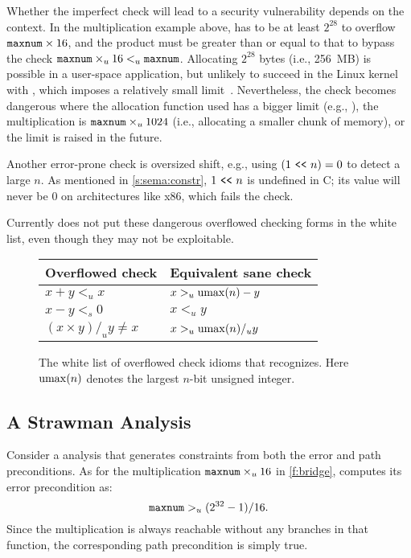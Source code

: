 Whether the imperfect check will lead to a security vulnerability
depends on the context.  In the multiplication example above,
 has to be at least $2^{28}$ to overflow $\texttt{maxnum}
\times 16$, and the product must be greater than or equal to that
to bypass the check $\texttt{maxnum} \times_u 16 <_u \texttt{maxnum}$.
Allocating $2^{28}$ bytes (i.e., 256~MB) is possible in a user-space
application, but unlikely to succeed in the Linux kernel with
, which imposes a relatively small
limit~\cite[\chapterautorefname~8]{ldd3}.  Nevertheless, the check
becomes dangerous where the allocation function used has a bigger
limit (e.g., ), the multiplication is $\texttt{maxnum}
\times_u 1024$ (i.e., allocating a smaller chunk of memory), or the
 limit is raised in the future.

Another error-prone check is oversized shift, e.g., using $(1 \ \texttt{<}\texttt{<}\ 
n) = 0$ to detect a large $n$.  As mentioned in \autoref{s:sema:constr},
${1 \ \texttt{<}\texttt{<}\  n}$ is undefined in C; its value will never be 0 on
architectures like x86, which fails the check.

Currently \sys does not put these dangerous overflowed checking
forms in the white list, even though they may not be exploitable.

\begin{figure}
\centering
\begin{tabular}{ll}
\toprule
Overflowed check & Equivalent sane check \\ \midrule
$x + y <_u x$ & $x >_u \operatorname{umax}(n) - y$ \\
$x - y <_s 0$ & $x <_u y$ \\
$(x \times y) /_u y \neq x$ & $x >_u \operatorname{umax}(n) /_u y$   \\
\bottomrule
\end{tabular}
\caption{The white list of overflowed check idioms that \sys recognizes.
Here $\operatorname{umax}(n)$ denotes the largest $n$-bit unsigned integer.}
\label{f:whitelist}
\end{figure}


\subsection{A Strawman Analysis}

Consider a \naive analysis that generates constraints from both the
error and path preconditions.  As for the multiplication $\texttt{maxnum}
\times_u 16$ in \autoref{f:bridge}, \sys computes its error
precondition as:
\begin{equation*}
\texttt{maxnum} >_u (2^{32} - 1) / 16.
\end{equation*}
Since the multiplication is always reachable without any branches
in that function, the corresponding path precondition is simply true.

